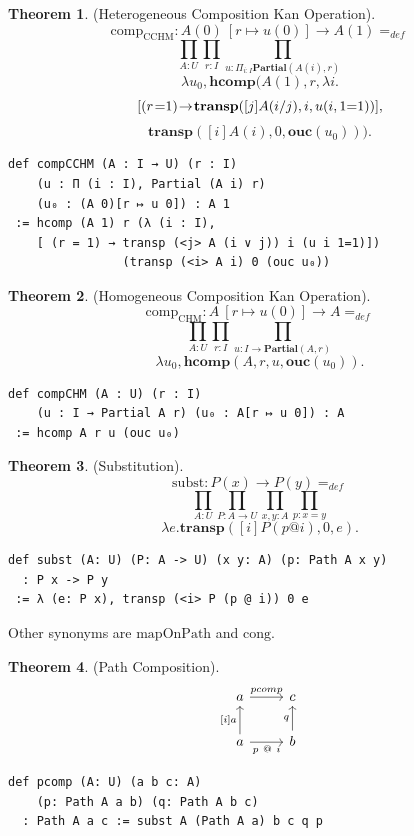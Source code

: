 \documentclass{article}
\theoremstyle{definition}
\newtheorem{theorem}{Theorem}
\begin{document}
\begin{theorem} (Heterogeneous Composition Kan Operation).
$$
  \mathrm{comp}_{\mathrm{CCHM}} : A(0)\ [r \mapsto u(0)] \rightarrow A(1) =_{def}
$$
$$
  \prod_{A:U}\prod_{r:I} \prod_{u: \Pi_{i:I}\mathbf{Partial}(A(i),r)}
$$
$$
  \lambda u_0, \mathbf{hcomp}(A(1),r,\lambda i.
$$
$$
  [(r\hspace{0.1em}\mbox{=}1)\hspace{-0.2em}\rightarrow\hspace{-0.2em}\mathbf{transp}([j]A(i /\\ j),i,u(i,1\hspace{0em}\mbox{=}1)) ],
$$
$$
  \mathbf{transp}([i]A(i),0,\mathbf{ouc}(u_0))).
$$
\begin{lstlisting}[mathescape=true]
def compCCHM (A : I → U) (r : I)
    (u : Π (i : I), Partial (A i) r)
    (u₀ : (A 0)[r ↦ u 0]) : A 1
 := hcomp (A 1) r (λ (i : I),
    [ (r = 1) → transp (<j> A (i ∨ j)) i (u i 1=1)])
                (transp (<i> A i) 0 (ouc u₀))
\end{lstlisting}
\end{theorem}

\begin{theorem} (Homogeneous Composition Kan Operation).
$$
  \mathrm{comp}_{\mathrm{CHM}} : A\ [r \mapsto u(0)] \rightarrow A =_{def}
$$
$$
  \prod_{A:U}\prod_{r:I} \prod_{u:I\rightarrow \mathbf{Partial}(A,r)}
$$
$$
  \lambda u_0, \mathbf{hcomp}(A,r,u,\mathbf{ouc}(u_0)).
$$
\begin{lstlisting}[mathescape=true]
def compCHM (A : U) (r : I)
    (u : I → Partial A r) (u₀ : A[r ↦ u 0]) : A
 := hcomp A r u (ouc u₀)
\end{lstlisting}
\end{theorem}

\begin{theorem} (Substitution).
$$
  \mathrm{subst} : P(x) \rightarrow P(y) =_{def}
$$
$$
  \prod_{A:U}\prod_{P:A\rightarrow U}\prod_{x,y:A}\prod_{p:x=y}
$$
$$
  \lambda e.\mathbf{transp}([i] P (p @ i),0,e).
$$
\begin{lstlisting}[mathescape=true]
def subst (A: U) (P: A -> U) (x y: A) (p: Path A x y)
  : P x -> P y
 := λ (e: P x), transp (<i> P (p @ i)) 0 e
\end{lstlisting}
\end{theorem}

Other synonyms are $\mathrm{mapOnPath}$ and $\mathrm{cong}$.

\newpage
\begin{theorem} (Path Composition).
$$
\begin{tikzcd}
  a \arrow[r, "pcomp"] & c \\
  a \arrow[u, "{[i]a}"] \arrow[r, "p\ @\ i"'] & b \arrow[u, "q"]
\end{tikzcd}
$$
\begin{lstlisting}[mathescape=true]
def pcomp (A: U) (a b c: A)
    (p: Path A a b) (q: Path A b c)
  : Path A a c := subst A (Path A a) b c q p
\end{lstlisting}
\end{theorem}
\end{document}
